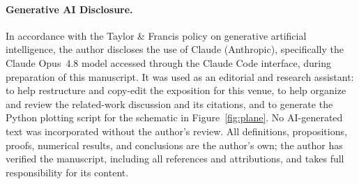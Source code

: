 \documentclass[11pt]{article}
\theoremstyle{definition}
\begin{document}
\paragraph{Generative AI Disclosure.} In accordance with the Taylor \& Francis policy on
generative artificial intelligence, the author discloses the use of Claude (Anthropic),
specifically the Claude Opus~4.8 model accessed through the Claude Code interface, during
preparation of this manuscript. It was used as an editorial and research assistant: to help
restructure and copy-edit the exposition for this venue, to help organize and review the
related-work discussion and its citations, and to generate the Python plotting script for the
schematic in Figure~\ref{fig:plane}. No AI-generated text was incorporated without the
author's review. All definitions, propositions, proofs, numerical results, and conclusions
are the author's own; the author has verified the manuscript, including all references and
attributions, and takes full responsibility for its content.



\end{document}
